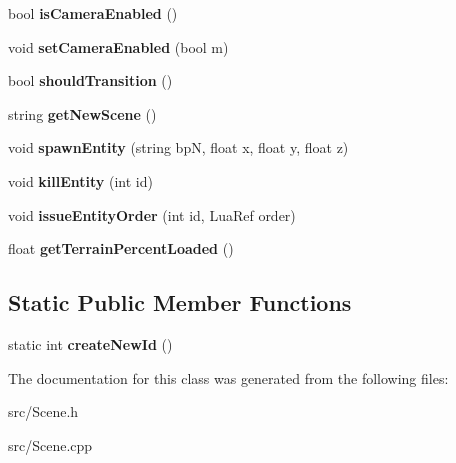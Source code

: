 \begin{DoxyCompactItemize}
bool {\bfseries is\+Camera\+Enabled} ()
\item 
\mbox{\label{classdarksun_1_1_scene_ab2a1934a6763135d7c94b301436210be}} 
void {\bfseries set\+Camera\+Enabled} (bool m)
\item 
\mbox{\label{classdarksun_1_1_scene_a7d904c6e6b36d8c66440a519f6799756}} 
bool {\bfseries should\+Transition} ()
\item 
\mbox{\label{classdarksun_1_1_scene_a3bc16462fc717c2edd139f284fdb8a34}} 
string {\bfseries get\+New\+Scene} ()
\item 
\mbox{\label{classdarksun_1_1_scene_aa7ecbe5ad643fd611e339c87eb521b3d}} 
void {\bfseries spawn\+Entity} (string bpN, float x, float y, float z)
\item 
\mbox{\label{classdarksun_1_1_scene_a92462f19ccaed45a8282442543bd8f54}} 
void {\bfseries kill\+Entity} (int id)
\item 
\mbox{\label{classdarksun_1_1_scene_a1a9d237cd6e5853681a822e932f88e60}} 
void {\bfseries issue\+Entity\+Order} (int id, Lua\+Ref order)
\item 
\mbox{\label{classdarksun_1_1_scene_a7bd7329bbcfd6109cf5eabc63a31ca08}} 
float {\bfseries get\+Terrain\+Percent\+Loaded} ()
\end{DoxyCompactItemize}
\subsection*{Static Public Member Functions}
\begin{DoxyCompactItemize}
\item 
\mbox{\label{classdarksun_1_1_scene_ab4d349a60d2e7f0dee0f369759421ebf}} 
static int {\bfseries create\+New\+Id} ()
\end{DoxyCompactItemize}


The documentation for this class was generated from the following files\+:\begin{DoxyCompactItemize}
\item 
src/Scene.\+h\item 
src/Scene.\+cpp\end{DoxyCompactItemize}
